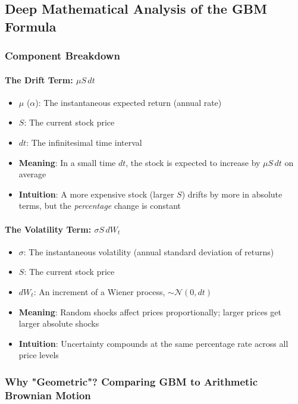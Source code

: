 \documentclass[12pt,a4paper]{article}
\begin{document}
\subsection{Deep Mathematical Analysis of the GBM Formula}

\subsubsection{Component Breakdown}

\paragraph{The Drift Term: $\mu S \, dt$}

\begin{itemize}
    \item \textbf{$\mu$} ($\alpha$): The instantaneous expected return (annual rate)
    \item \textbf{$S$}: The current stock price
    \item \textbf{$dt$}: The infinitesimal time interval
    \item \textbf{Meaning}: In a small time $dt$, the stock is expected to increase by $\mu S \, dt$ on average
    \item \textbf{Intuition}: A more expensive stock (larger $S$) drifts by more in absolute terms, but the \textit{percentage} change is constant
\end{itemize}

\paragraph{The Volatility Term: $\sigma S \, dW_t$}

\begin{itemize}
    \item \textbf{$\sigma$}: The instantaneous volatility (annual standard deviation of returns)
    \item \textbf{$S$}: The current stock price
    \item \textbf{$dW_t$}: An increment of a Wiener process, $\sim \mathcal{N}(0, dt)$
    \item \textbf{Meaning}: Random shocks affect prices proportionally; larger prices get larger absolute shocks
    \item \textbf{Intuition}: Uncertainty compounds at the same percentage rate across all price levels
\end{itemize}

\subsubsection{Why "Geometric"? Comparing GBM to Arithmetic Brownian Motion}
\end{document}
